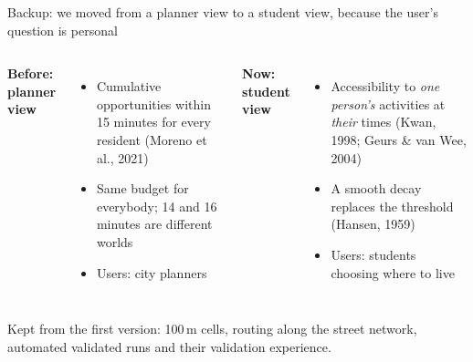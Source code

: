 \documentclass[aspectratio=169,10pt]{beamer}
\begin{document}
\begin{frame}{Backup: we moved from a planner view to a student view, because the user's
  question is personal}
  \begin{columns}[T,onlytextwidth]
      \textbf{Before: planner view}\par\smallskip
      \begin{itemize}\footnotesize
        \item Cumulative opportunities within 15 minutes for every resident
              (Moreno et al., 2021)
        \item Same budget for everybody; 14 and 16 minutes are different worlds
        \item Users: city planners
      \end{itemize}
      \textbf{Now: student view}\par\smallskip
      \begin{itemize}\footnotesize
        \item Accessibility to \emph{one person's} activities at \emph{their} times
              (Kwan, 1998; Geurs \& van Wee, 2004)
        \item A smooth decay replaces the threshold (Hansen, 1959)
        \item Users: students choosing where to live
      \end{itemize}
  \end{columns}
  \vspace{5mm}
  {\footnotesize Kept from the first version: 100\,m cells, routing along the street network,
  automated validated runs and their validation experience.}
\end{frame}
\end{document}
